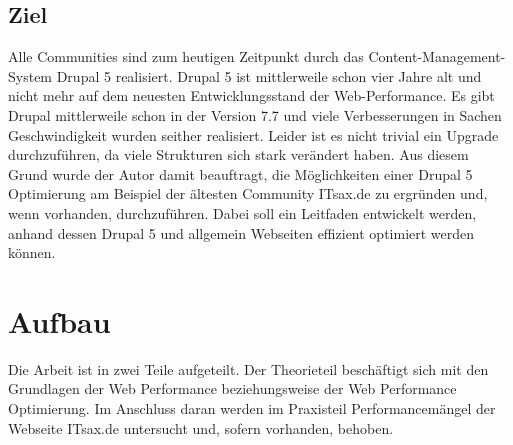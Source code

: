 \subsection{Ziel}
Alle Communities sind zum heutigen Zeitpunkt durch das Content-Management-System Drupal 5 realisiert. Drupal 5 ist mittlerweile schon vier Jahre alt und nicht mehr auf dem neuesten Entwicklungsstand der Web-Performance. Es gibt Drupal mittlerweile schon in der Version 7.7 und viele Verbesserungen in Sachen Geschwindigkeit wurden seither realisiert. Leider ist es nicht trivial ein Upgrade durchzuführen, da viele Strukturen sich stark verändert haben. Aus diesem Grund wurde der Autor damit beauftragt, die Möglichkeiten einer Drupal 5 Optimierung am Beispiel der ältesten Community ITsax.de zu ergründen und, wenn vorhanden, durchzuführen. Dabei soll ein Leitfaden entwickelt werden, anhand dessen Drupal 5 und allgemein Webseiten effizient optimiert werden können.

\section{Aufbau}
Die Arbeit ist in zwei Teile aufgeteilt. Der Theorieteil beschäftigt sich mit den Grundlagen der Web Performance beziehungsweise der Web Performance Optimierung. Im Anschluss daran werden im Praxisteil Performancemängel der Webseite ITsax.de untersucht und, sofern vorhanden, behoben. 
